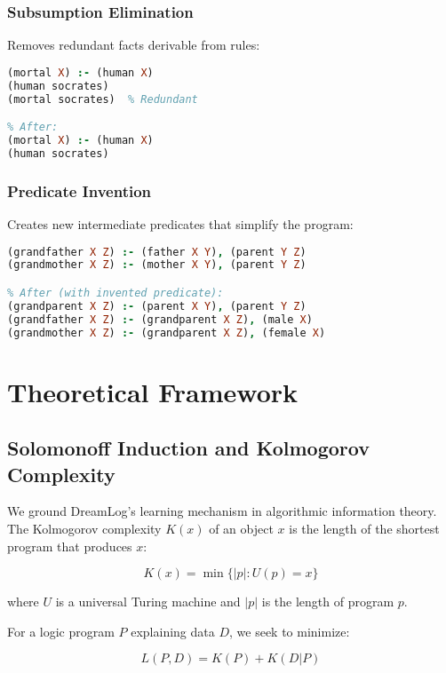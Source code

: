 \documentclass[10pt,conference]{IEEEtran}
\begin{document}
\subsubsection{Subsumption Elimination}
Removes redundant facts derivable from rules:
\begin{lstlisting}[language=Prolog]
% Before:
(mortal X) :- (human X)
(human socrates)
(mortal socrates)  % Redundant

% After:
(mortal X) :- (human X)
(human socrates)
\end{lstlisting}

\subsubsection{Predicate Invention}
Creates new intermediate predicates that simplify the program:
\begin{lstlisting}[language=Prolog]
% Before:
(grandfather X Z) :- (father X Y), (parent Y Z)
(grandmother X Z) :- (mother X Y), (parent Y Z)

% After (with invented predicate):
(grandparent X Z) :- (parent X Y), (parent Y Z)
(grandfather X Z) :- (grandparent X Z), (male X)
(grandmother X Z) :- (grandparent X Z), (female X)
\end{lstlisting}

\section{Theoretical Framework}

\subsection{Solomonoff Induction and Kolmogorov Complexity}

We ground DreamLog's learning mechanism in algorithmic information theory. The Kolmogorov complexity $K(x)$ of an object $x$ is the length of the shortest program that produces $x$:

\begin{equation}
K(x) = \min\{|p| : U(p) = x\}
\end{equation}

where $U$ is a universal Turing machine and $|p|$ is the length of program $p$.

For a logic program $P$ explaining data $D$, we seek to minimize:

\begin{equation}
L(P, D) = K(P) + K(D|P)
\end{equation}
\end{document}
